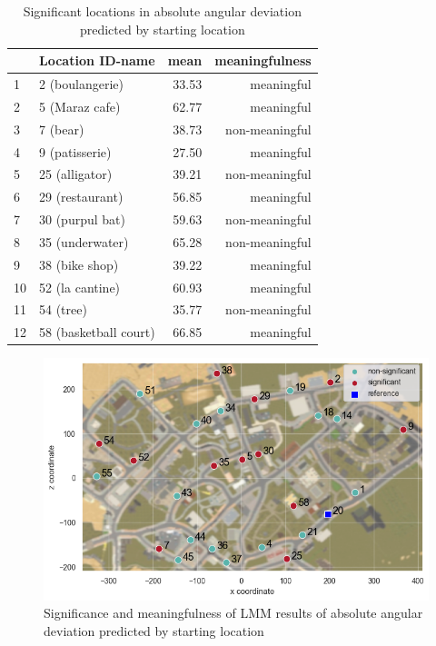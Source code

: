 \begin{table}[h]
	\begin{center}
		\caption[Significant locations in absolute angular deviation predicted by starting location]{Significant locations in absolute angular deviation predicted by starting location} \vspace{10pt}
		\begin{tabular}{l l r r} 
			\hline 
			{} & \setrow{\bfseries} Location ID-name & \setrow{\bfseries} mean & \setrow{\bfseries} meaningfulness \\ [.7ex] 
			\hline\hline
			1 & 2 (boulangerie)		& 		33.53 		& meaningful	  \\ 
			\hline
			2 & 5 (Maraz cafe)		& 		62.77	 	& meaningful 	  \\
			\hline
			3 & 7 (bear) 			& 		38.73		& non-meaningful  \\
			\hline
			4 & 9 (patisserie) 		& 		27.50 		& meaningful	  \\
			\hline
			5 & 25 (alligator) 		& 		39.21 		& non-meaningful  \\ 
			\hline
			6 & 29 (restaurant)		& 		56.85 		& meaningful  \\ 
			\hline
			7 & 30 (purpul bat)		& 		59.63 		& non-meaningful  \\ 
			\hline
			8 & 35 (underwater)		& 		65.28 		& non-meaningful  \\
			\hline
			9 & 38 (bike shop)		& 		39.22 		& meaningful  \\
			\hline
			10 & 52 (la cantine)		& 		60.93 		& meaningful  \\
			\hline
			11 & 54 (tree)			& 		35.77 		& non-meaningful  \\
			\hline
			12 & 58 (basketball court)		& 		66.85 		& meaningful  \\ 		[1ex]
			\hline
		\end{tabular}
		\label{tab:sig_angle_loc}
	\end{center}
\end{table}

\begin{figure}[!htb]
	\centering
	\includegraphics[width=150mm]{figures/significance_starting_locations_angular_error_map_23.png}
	\caption[Significance and meaningfulness (absolute angular deviation predicted by starting location)]{Significance and meaningfulness of LMM results of absolute angular deviation predicted by starting location}
	\label{fig:sig_angle_loc_map}
\end{figure}

